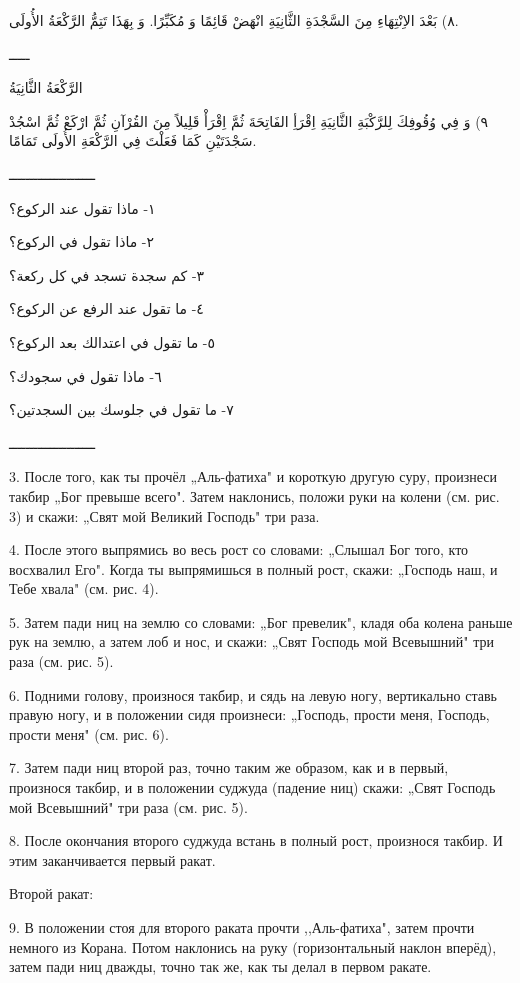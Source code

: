 \documentclass[a5paper]{article}
\begin{document}
٨) بَعْدَ الاِنْتِهَاءِ مِنَ السَّجْدَةِ الثَّانِيَةِ انْهَضْ قَائِمًا وَ مُكَبِّرًا. وَ بِهَذَا تَتِمُّ الرَّكْعَةُ الأُولَى.

ـــــ

الرَّكْعَةُ الثَّانِيَةُ

٩) وَ فِي وُقُوفِكَ لِلرَّكْبَةِ الثَّانِيَةِ اِقْرَأِ الفَاتِحَةَ ثُمَّ اِقْرَأْ قَلِيلاً مِنَ القُرْآنِ ثُمَّ ارْكَعْ ثُمَّ اسْجُدْ سَجْدَتَيْنِ كَمَا فَعَلْتَ فِي الرَّكْعَةِ الأُولَى تَمَامًا.

ـــــــــــــــــــــ

١- ماذا تقول عند الركوع؟

٢- ماذا تقول في الركوع؟

٣- كم سجدة تسجد في كل ركعة؟

٤- ما تقول عند الرفع عن الركوع؟

٥- ما تقول في اعتدالك بعد الركوع؟

٦- ماذا تقول في سجودك؟

٧- ما تقول في جلوسك بين السجدتين؟

ـــــــــــــــــــــ

3. После того, как ты прочёл „Аль-фатиха" и короткую другую суру, произнеси такбир „Бог превыше всего". Затем наклонись, положи руки на колени (см. рис. 3) и скажи: „Свят мой Великий Господь" три раза.

4. После этого выпрямись во весь рост со словами: „Слышал Бог того, кто восхвалил Его". Когда ты выпрямишься в полный рост, скажи: „Господь наш, и Тебе хвала" (см. рис. 4).

5. Затем пади ниц на землю со словами: „Бог превелик", кладя оба колена раньше рук на землю, а затем лоб и нос, и скажи: „Свят Господь мой Всевышний" три раза (см. рис. 5).

6. Подними голову, произнося такбир, и сядь на левую ногу, вертикально ставь правую ногу, и в положении сидя произнеси: „Господь, прости меня, Господь, прости меня" (см. рис. 6).

7. Затем пади ниц второй раз, точно таким же образом, как и в первый, произнося такбир, и в положении суджуда (падение ниц) скажи: „Свят Господь мой Всевышний" три раза (см. рис. 5).

8. После окончания второго суджуда встань в полный рост, произнося такбир. И этим заканчивается первый ракат.

Второй ракат:

9. В положении стоя для второго раката прочти ,,Аль-фатиха", затем прочти немного из Корана. Потом наклонись на руку (горизонтальный наклон вперёд), затем пади ниц дважды, точно так же, как ты делал в первом ракате.
\end{document}
